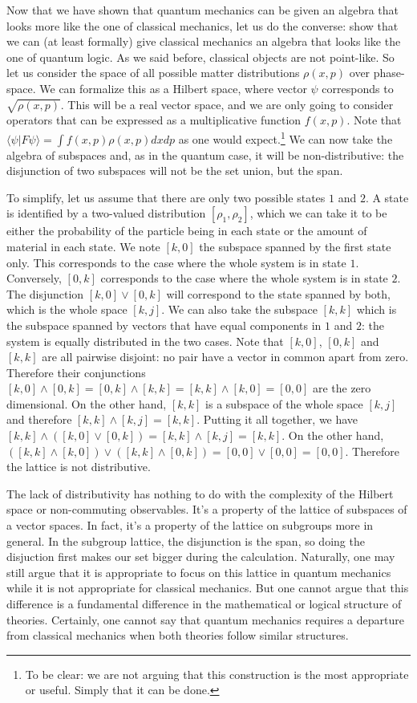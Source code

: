 \documentclass[10pt,twocolumn, nofootinbib]{revtex4-1}
\begin{document}
Now that we have shown that quantum mechanics can be given an algebra that looks more like the one of classical mechanics, let us do the converse: show that we can (at least formally) give classical mechanics an algebra that looks like the one of quantum logic. As we said before, classical objects are not point-like. So let us consider the space of all possible matter distributions $\rho(x,p)$ over phase-space. We can formalize this as a Hilbert space, where vector $\psi$ corresponds to $\sqrt{\rho(x,p)}$. This will be a real vector space, and we are only going to consider operators that can be expressed as a multiplicative function $f(x,p)$. Note that $\langle \psi | F \psi \rangle = \int f(x,p) \rho(x,p) dx dp$ as one would expect.\footnote{To be clear: we are not arguing that this construction is the most appropriate or useful. Simply that it can be done.}  We can now take the algebra of subspaces and, as in the quantum case, it will be non-distributive: the disjunction of two subspaces will not be the set union, but the span.

To simplify, let us assume that there are only two possible states $1$ and $2$. A state is identified by a two-valued distribution $[\rho_1, \rho_2]$, which we can take it to be either the probability of the particle being in each state or the amount of material in each state. We note $[k,0]$ the subspace spanned by the first state only. This corresponds to the case where the whole system is in state $1$. Conversely, $[0,k]$ corresponds to the case where the whole system is in state $2$. The disjunction $[k,0] \vee [0,k]$ will correspond to the state spanned by both, which is the whole space $[k,j]$. We can also take the subspace $[k,k]$ which is the subspace spanned by vectors that have equal components in $1$ and $2$: the system is equally distributed in the two cases. Note that $[k,0]$, $[0,k]$ and $[k,k]$ are all pairwise disjoint: no pair have a vector in common apart from zero. Therefore their conjunctions $[k,0] \wedge [0,k] = [0,k] \wedge [k,k] = [k,k] \wedge [k,0] = [0,0]$ are the zero dimensional. On the other hand, $[k,k]$ is a subspace of the whole space $[k,j]$ and therefore $[k,k] \wedge [k,j] = [k,k]$. Putting it all together, we have $[k,k] \wedge ( [k,0] \vee [0,k] ) = [k,k] \wedge [k,j] = [k,k]$. On the other hand, $( [k,k] \wedge [k,0] ) \vee ( [k,k] \wedge [0,k] ) = [0,0] \vee [0,0] = [0,0]$. Therefore the lattice is not distributive.

The lack of distributivity has nothing to do with the complexity of the Hilbert space or non-commuting observables. It's a property of the lattice of subspaces of a vector spaces. In fact, it's a property of the lattice on subgroups more in general. In the subgroup lattice, the disjunction is the span, so doing the disjuction first makes our set bigger during the calculation. Naturally, one may still argue that it is appropriate to focus on this lattice in quantum mechanics while it is not appropriate for classical mechanics. But one cannot argue that this difference is a fundamental difference in the mathematical or logical structure of theories. Certainly, one cannot say that quantum mechanics requires a departure from classical mechanics when both theories follow similar structures.
\end{document}
